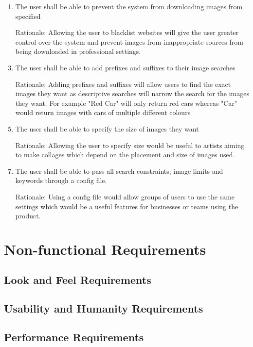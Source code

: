 \documentclass[12pt, titlepage]{article}
\begin{document}
\begin{enumerate}[label=FR \arabic*:, wide=0pt, leftmargin=*]
    \\
    \item The user shall be able to prevent the system from downloading images from specified
    \item[Rationale:] Allowing the user to blacklist websites will give the user greater control over the system and prevent images from inappropriate sources from being downloaded in professional settings. 
    \\
    \item The user shall be able to add prefixes and suffixes to their image searches
    \item[Rationale:] Adding prefixes and suffixes will allow users to find the exact images they want as descriptive searches will narrow the search for the images they want. For example "Red Car" will only return red cars whereas "Car" would return images with cars of multiple different colours
    \\
    \item The user shall be able to specify the size of images they want
    \item[Rationale:] Allowing the user to specify size would be useful to artists aiming to make collages which depend on the placement and size of images used.
    \\
    \item The user shall be able to pass all search constraints, image limits and keywords through a config file.
    \item[Rationale:] Using a config file would allow groups of users to use the same settings which would be a useful features for businesses or teams using the product.

\end{enumerate}

\section{Non-functional Requirements}

\subsection{Look and Feel Requirements}

\subsection{Usability and Humanity Requirements}

\subsection{Performance Requirements}
\end{document}
